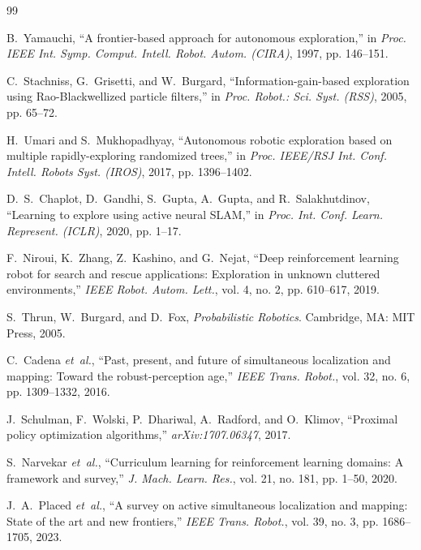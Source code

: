\documentclass[conference]{IEEEtran}
\begin{document}
\begin{thebibliography}{99}

B.~Yamauchi, ``A frontier-based approach for autonomous exploration,'' in \textit{Proc. IEEE Int. Symp. Comput. Intell. Robot. Autom. (CIRA)}, 1997, pp. 146--151.

C.~Stachniss, G.~Grisetti, and W.~Burgard, ``Information-gain-based exploration using Rao-Blackwellized particle filters,'' in \textit{Proc. Robot.: Sci. Syst. (RSS)}, 2005, pp. 65--72.

H.~Umari and S.~Mukhopadhyay, ``Autonomous robotic exploration based on multiple rapidly-exploring randomized trees,'' in \textit{Proc. IEEE/RSJ Int. Conf. Intell. Robots Syst. (IROS)}, 2017, pp. 1396--1402.

D.~S.~Chaplot, D.~Gandhi, S.~Gupta, A.~Gupta, and R.~Salakhutdinov, ``Learning to explore using active neural SLAM,'' in \textit{Proc. Int. Conf. Learn. Represent. (ICLR)}, 2020, pp. 1--17.

F.~Niroui, K.~Zhang, Z.~Kashino, and G.~Nejat, ``Deep reinforcement learning robot for search and rescue applications: Exploration in unknown cluttered environments,'' \textit{IEEE Robot. Autom. Lett.}, vol. 4, no. 2, pp. 610--617, 2019.

S.~Thrun, W.~Burgard, and D.~Fox, \textit{Probabilistic Robotics}. Cambridge, MA: MIT Press, 2005.

C.~Cadena \textit{et~al.}, ``Past, present, and future of simultaneous localization and mapping: Toward the robust-perception age,'' \textit{IEEE Trans. Robot.}, vol. 32, no. 6, pp. 1309--1332, 2016.

J.~Schulman, F.~Wolski, P.~Dhariwal, A.~Radford, and O.~Klimov, ``Proximal policy optimization algorithms,'' \textit{arXiv:1707.06347}, 2017.

S.~Narvekar \textit{et~al.}, ``Curriculum learning for reinforcement learning domains: A framework and survey,'' \textit{J. Mach. Learn. Res.}, vol. 21, no. 181, pp. 1--50, 2020.

J.~A.~Placed \textit{et~al.}, ``A survey on active simultaneous localization and mapping: State of the art and new frontiers,'' \textit{IEEE Trans. Robot.}, vol. 39, no. 3, pp. 1686--1705, 2023.


\end{thebibliography}
\end{document}
